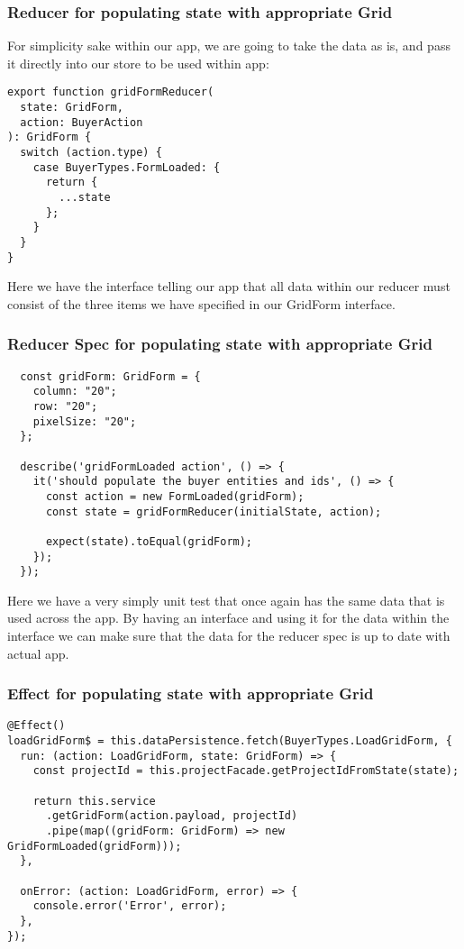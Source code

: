 \subsubsection{ Reducer for populating state with appropriate Grid }
For simplicity sake within our app, we are going to take the data as is, and
pass it directly into our store to be used within app:
\begin{lstlisting}
export function gridFormReducer(
  state: GridForm,
  action: BuyerAction
): GridForm {
  switch (action.type) {
    case BuyerTypes.FormLoaded: {
      return {
        ...state
      };
    }
  }
}
\end{lstlisting}

Here we have the interface telling our app that all data within our reducer
must consist of the three items we have specified in our GridForm interface.

\subsubsection{ Reducer Spec for populating state with appropriate Grid }
\begin{lstlisting}
  const gridForm: GridForm = {
    column: "20";
    row: "20";
    pixelSize: "20";
  };

  describe('gridFormLoaded action', () => {
    it('should populate the buyer entities and ids', () => {
      const action = new FormLoaded(gridForm);
      const state = gridFormReducer(initialState, action);

      expect(state).toEqual(gridForm);
    });
  });
\end{lstlisting}

Here we have a very simply unit test that once again has the same data that is
used across the app. By having an interface and using it for the data within the
interface we can make sure that the data for the reducer spec is up to date with
actual app.

\subsubsection{ Effect for populating state with appropriate Grid }
\begin{lstlisting}
@Effect()
loadGridForm$ = this.dataPersistence.fetch(BuyerTypes.LoadGridForm, {
  run: (action: LoadGridForm, state: GridForm) => {
    const projectId = this.projectFacade.getProjectIdFromState(state);

    return this.service
      .getGridForm(action.payload, projectId)
      .pipe(map((gridForm: GridForm) => new GridFormLoaded(gridForm)));
  },

  onError: (action: LoadGridForm, error) => {
    console.error('Error', error);
  },
});
\end{lstlisting}

